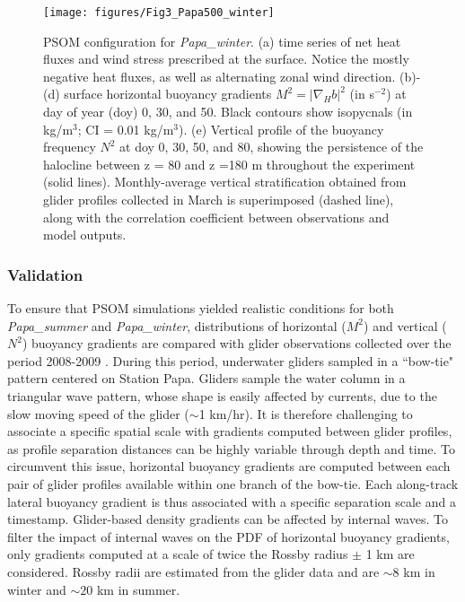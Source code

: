 \documentclass[article,linenumbers]{agujournal2018}
\begin{document}
\begin{figure}[ht]
	\texttt{[image: figures/Fig3\_Papa500\_winter]}
	\caption{PSOM configuration for \textit{Papa\_winter}. (a) time series of net heat fluxes and wind stress prescribed at the surface. Notice the mostly negative heat fluxes, as well as alternating zonal wind direction. (b)-(d) surface horizontal buoyancy gradients $M^2 = |\nabla_Hb|^2$ (in s$^{-2}$) at day of year (doy) 0, 30, and 50. Black contours show isopycnals (in kg/m$^3$; CI = 0.01 kg/m$^3$). (e) Vertical profile of the buoyancy frequency $N^2$ at doy 0, 30, 50, and 80, showing the persistence of the halocline between z = 80 and z =180 m throughout the experiment (solid lines). Monthly-average vertical stratification obtained from glider profiles collected in March is superimposed (dashed line), along with the correlation coefficient between observations and model outputs.}
	\label{fig: Papa_winter}
\end{figure}


\subsubsection{Validation}
\label{sec: glider_validation}

To ensure that PSOM simulations yielded realistic conditions for both \textit{Papa\_summer} and \textit{Papa\_winter}, distributions of horizontal ($M^2$) and vertical ($N^2$) buoyancy gradients are compared with glider observations collected over the period 2008-2009 \citep{Pelland_2016}.
During this period, underwater gliders sampled in a ``bow-tie" pattern centered on Station Papa. Gliders sample the water column in a triangular wave pattern, whose shape is easily affected by currents, due to the slow moving speed of the glider ($\sim$1 km/hr). It is therefore challenging to associate a specific spatial scale with gradients computed between glider profiles, as profile separation distances can be highly variable through depth and time. To circumvent this issue, horizontal buoyancy gradients are computed between each pair of glider profiles available within one branch of the bow-tie. Each along-track lateral buoyancy gradient is thus associated with a specific separation scale and a timestamp. Glider-based density gradients can be affected by internal waves. To filter the impact of internal waves on the PDF of horizontal buoyancy gradients, only gradients computed at a scale of twice the Rossby radius $\pm$ 1 km are considered. Rossby radii are estimated from the glider data and are $\sim8$ km in winter and $\sim20$ km in summer.
 
\end{document}
